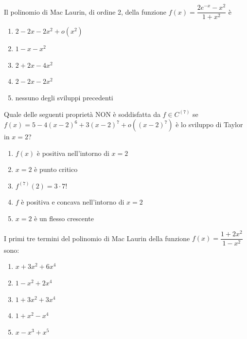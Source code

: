 \begin{quiz}
Il polinomio di Mac Laurin, di ordine 2, della funzione $f(x)=\dfrac{2e^{-x}-x^2}{1+x^2}$ \`e
\begin{enumerate}[label=\alph*),leftmargin=1.3cm,itemsep=3pt,topsep=5pt]
\item $2-2x-2x^2+o(x^2)$
\item $1-x-x^2$
\item $2+2x-4x^2$
\item $2-2x-2x^2$
\item nessuno degli sviluppi precedenti
\end{enumerate}
\end{quiz}

\begin{quiz}
Quale delle seguenti propriet\`a NON \`e soddisfatta da $f\in C^{(7)}$ se $f(x)=5-4(x-2)^6+3(x-2)^7+o((x-2)^7)$ \`e lo sviluppo di Taylor in $x=2$?
\begin{enumerate}[label=\alph*),leftmargin=1.3cm,itemsep=3pt,topsep=5pt]
\item $f(x)$ \`e positiva nell'intorno di $x=2$
\item $x=2$ \`e punto critico
\item $f^{(7)}(2)=3\cdot7!$
\item $f$ \`e positiva e concava nell'intorno di $x=2$
\item $x=2$ \`e un flesso crescente
\end{enumerate}
\end{quiz}

\begin{quiz}
I primi tre termini del polinomio di Mac Laurin della funzione $f(x)=\dfrac{1+2x^2}{1-x^2}$ sono:
\begin{enumerate}[label=\alph*),leftmargin=1.3cm,itemsep=3pt,topsep=5pt]
\item $x+3x^2+6x^4$
\item $1-x^2+2x^4$
\item $1+3x^2+3x^4$
\item $1+x^2-x^4$
\item $x-x^3+x^5$
\end{enumerate}
\end{quiz}


